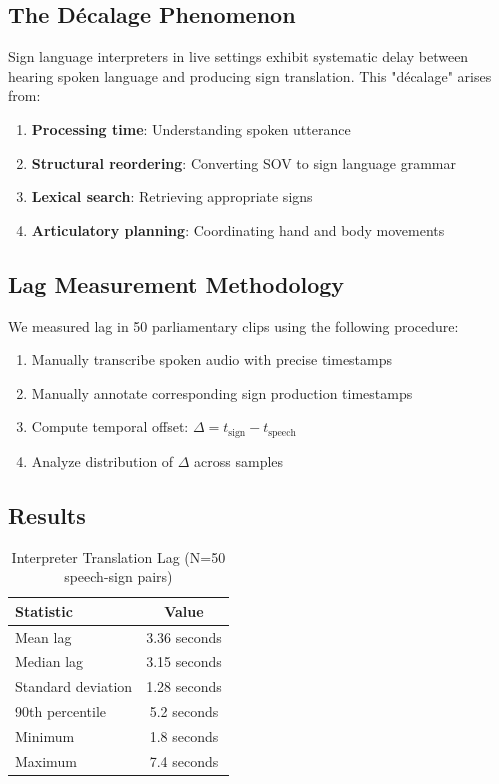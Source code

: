 \documentclass[11pt,a4paper]{article}
\begin{document}
\subsection{The Décalage Phenomenon}

Sign language interpreters in live settings exhibit systematic delay between hearing spoken language and producing sign translation. This "décalage" arises from:

\begin{enumerate}
    \item \textbf{Processing time}: Understanding spoken utterance
    \item \textbf{Structural reordering}: Converting SOV to sign language grammar
    \item \textbf{Lexical search}: Retrieving appropriate signs
    \item \textbf{Articulatory planning}: Coordinating hand and body movements
\end{enumerate}

\subsection{Lag Measurement Methodology}

We measured lag in 50 parliamentary clips using the following procedure:

\begin{enumerate}
    \item Manually transcribe spoken audio with precise timestamps
    \item Manually annotate corresponding sign production timestamps
    \item Compute temporal offset: $\Delta = t_{\text{sign}} - t_{\text{speech}}$
    \item Analyze distribution of $\Delta$ across samples
\end{enumerate}

\subsection{Results}

\begin{table}[htbp]
\centering
\caption{Interpreter Translation Lag (N=50 speech-sign pairs)}
\begin{tabular}{@{}lc@{}}
\toprule
\textbf{Statistic} & \textbf{Value} \\ \midrule
Mean lag & 3.36 seconds \\
Median lag & 3.15 seconds \\
Standard deviation & 1.28 seconds \\
90th percentile & 5.2 seconds \\
Minimum & 1.8 seconds \\
Maximum & 7.4 seconds \\
\bottomrule
\end{tabular}
\end{table}
\end{document}
